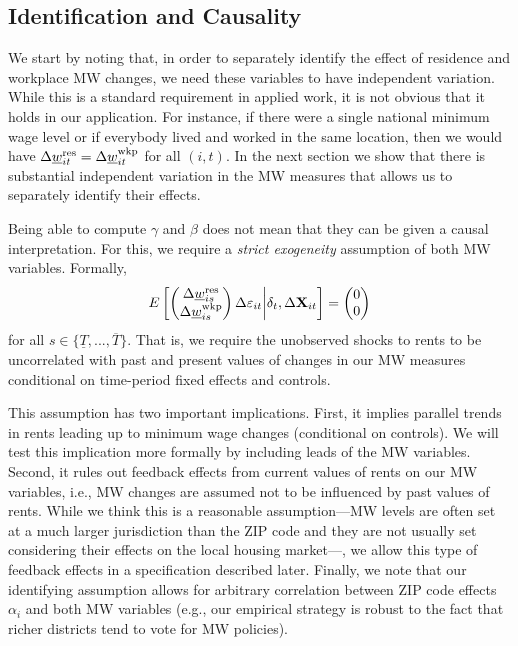 \subsection{Identification and Causality}

We start by noting that, in order to separately identify the effect of 
residence and workplace MW changes, we need these variables to have independent
variation.
While this is a standard requirement in applied work, it is not obvious that it 
holds in our application.
For instance, if there were a single national minimum wage level or if everybody 
lived and worked in the same location, then we would have
$\Delta \underline{w}^{\text{res}}_{it} = \Delta \underline{w}^{\text{wkp}}_{it}$ for all $(i,t)$.
In the next section we show that there is substantial independent variation
in the MW measures that allows us to separately identify their effects.

Being able to compute $\gamma$ and $\beta$ does not mean that they can be given
a causal interpretation.
For this, we require a \textit{strict exogeneity} assumption of both MW 
variables. 
Formally,
\begin{equation}\label{eq:strict_exogeneity}
    E\left[
        \begin{pmatrix}
            \Delta \underline{w}^{\text{res}}_{is} \\
            \Delta \underline{w}^{\text{wkp}}_{is} \\
        \end{pmatrix}
        \Delta \varepsilon_{it}
    \bigg| \delta_t, \Delta \mathbf{X}_{it} \right] =
    \begin{pmatrix}
        0 \\
        0 \\
    \end{pmatrix}
\end{equation}
for all $s\in\{\underline{T}, ..., \overline{T}\}$.
That is, we require the unobserved shocks to rents to be uncorrelated with 
past and present values of changes in our MW measures conditional on time-period 
fixed effects and controls.

This assumption has two important implications.
First,
it implies parallel trends in rents leading up to minimum wage changes 
(conditional on controls). We will test this implication more formally by 
including leads of the MW variables.
Second,
it rules out feedback effects from current values of rents on our MW variables, 
i.e., MW changes are assumed not to be influenced by past values of rents.
While we think this is a reasonable assumption---MW levels are often set at a 
much larger jurisdiction than the ZIP code and they are not usually
set considering their effects on the local housing market---, we allow this type of 
feedback effects in a specification described later.
Finally, we note that our identifying assumption allows for arbitrary 
correlation between ZIP code effects $\alpha_i$ and both MW variables
(e.g., our empirical strategy is robust to the fact that richer districts tend 
to vote for MW policies).


